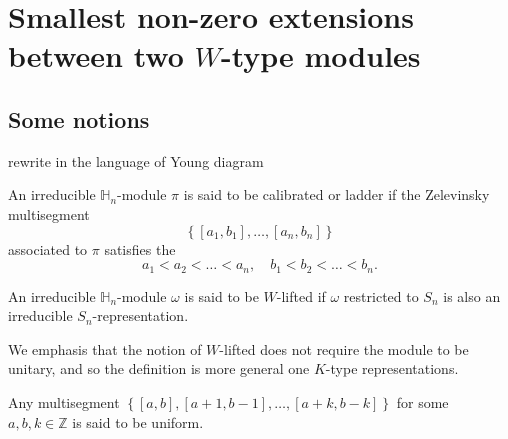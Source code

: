 
\section{Smallest non-zero extensions between two $W$-type modules}
\subsection{Some notions}

{\color{blue} rewrite in the language of Young diagram}
\begin{definition}
An irreducible $\mathbb H_n$-module $\pi$ is said to be calibrated or ladder if the Zelevinsky multisegment 
\[ \left\{ [a_1,b_1],\ldots, [a_n,b_n]\right\}\]
associated to $\pi$ satisfies the
\[    a_1 < a_2 < \ldots < a_n, \quad b_1<b_2< \ldots <b_n .
\]
\end{definition}


\begin{definition}
An irreducible $\mathbb H_n$-module $\omega$ is said to be $W$-lifted if $\omega$ restricted to $S_n$ is also an irreducible $S_n$-representation. 
\end{definition}

We emphasis that the notion of $W$-lifted does not require the module to be unitary, and so the definition is more general one $K$-type representations.


\begin{definition}
Any multisegment $\left\{ [a,b], [a+1, b-1], \ldots, [a+k,b-k]\right\}$ for some $a, b, k \in \mathbb Z$ is said to be uniform.
\end{definition}



